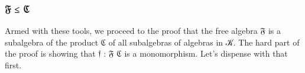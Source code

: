 \documentclass[a4paper,UKenglish,cleveref,autoref,thm-restate]{lipics-v2021}
\begin{document}
\subsubsection{𝔉 ≤ ℭ}\label{sssec:lemma-3}
Armed with these tools, we proceed to the proof that the free algebra \af 𝔉 is a subalgebra of the product ℭ of all subalgebras of algebras in 𝒦. 
The hard part of the proof is showing that \af 𝔣 \as :  \af 𝔉 \af ℭ is a monomorphism. Let's dispense with that first.
\ccpad
\begin{code}%
\>[1]\AgdaSpace{}%
\AgdaSymbol{:}\AgdaSpace{}%
\AgdaSpace{}%
\AgdaSpace{}%
\AgdaSpace{}%
\AgdaSpace{}%
\AgdaSpace{}%
\AgdaSymbol{(}\AgdaSpace{}%
\AgdaSymbol{)}\<%
\\
%
\>[1]\AgdaSpace{}%
\AgdaSymbol{=}\AgdaSpace{}%
\AgdaSpace{}%
\<%
\\
%
\\[\AgdaEmptyExtraSkip]%
%
\>[1]\AgdaSpace{}%
\AgdaSymbol{:}\AgdaSpace{}%
\AgdaSpace{}%
\AgdaSpace{}%
\AgdaSpace{}%
\<%
\\
%
\>[1]\AgdaSpace{}%
\AgdaSymbol{(}\AgdaSpace{}%
\AgdaDottedPattern{\AgdaSymbol{)}}\AgdaSpace{}%
\AgdaOperator{\AgdaInductiveConstructor{,}}\AgdaSpace{}%
\AgdaSpace{}%
\AgdaOperator{\AgdaInductiveConstructor{,}}\AgdaSpace{}%
\AgdaSpace{}%
\AgdaSymbol{\AgdaUnderscore{})}\AgdaSpace{}%
\AgdaSymbol{(}\AgdaSpace{}%
\AgdaDottedPattern{\AgdaSymbol{)}}\AgdaSpace{}%
\AgdaOperator{\AgdaInductiveConstructor{,}}\AgdaSpace{}%
\AgdaSpace{}%
\AgdaOperator{\AgdaInductiveConstructor{,}}\AgdaSpace{}%
\AgdaSpace{}%
\AgdaSymbol{\AgdaUnderscore{})}\AgdaSpace{}%
\AgdaSpace{}%
\AgdaSymbol{=}\AgdaSpace{}%
\<%
\\
\>[1][@{}l@{\AgdaIndent{0}}]%
\>[2]\<%
\\
%
\\[\AgdaEmptyExtraSkip]%
\>[2][@{}l@{\AgdaIndent{0}}]%
\>[3]\AgdaSpace{}%
\AgdaSymbol{:}\AgdaSpace{}%

\end{code}
\end{document}
